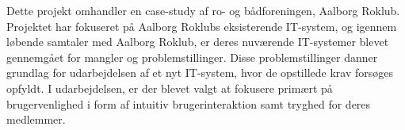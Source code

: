 
Dette projekt omhandler en case-study af ro- og bådforeningen, Aalborg Roklub. Projektet har fokuseret på Aalborg Roklubs eksisterende IT-system, og igennem løbende samtaler med Aalborg Roklub, er deres nuværende IT-systemer blevet gennemgået for mangler og problemstillinger. Disse problemstillinger danner grundlag for udarbejdelsen af et nyt IT-system, hvor de opstillede krav forsøges opfyldt. I udarbejdelsen, er der blevet valgt at fokusere primært på brugervenlighed i form af intuitiv brugerinteraktion samt tryghed for deres medlemmer.